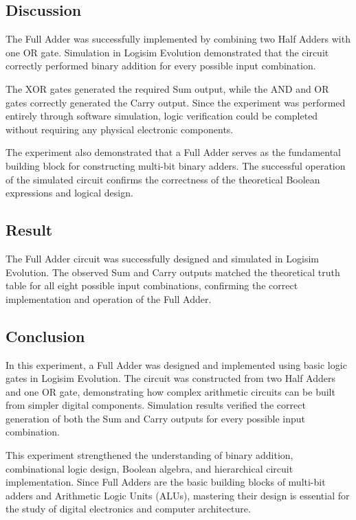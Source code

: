 \documentclass[12pt,a4paper]{article}
\begin{document}
\subsection{Discussion}

The Full Adder was successfully implemented by combining two Half Adders with one OR gate. Simulation in Logisim Evolution demonstrated that the circuit correctly performed binary addition for every possible input combination.

The XOR gates generated the required Sum output, while the AND and OR gates correctly generated the Carry output. Since the experiment was performed entirely through software simulation, logic verification could be completed without requiring any physical electronic components.

The experiment also demonstrated that a Full Adder serves as the fundamental building block for constructing multi-bit binary adders. The successful operation of the simulated circuit confirms the correctness of the theoretical Boolean expressions and logical design.

\subsection{Result}

The Full Adder circuit was successfully designed and simulated in Logisim Evolution. The observed Sum and Carry outputs matched the theoretical truth table for all eight possible input combinations, confirming the correct implementation and operation of the Full Adder.

\subsection{Conclusion}

In this experiment, a Full Adder was designed and implemented using basic logic gates in Logisim Evolution. The circuit was constructed from two Half Adders and one OR gate, demonstrating how complex arithmetic circuits can be built from simpler digital components. Simulation results verified the correct generation of both the Sum and Carry outputs for every possible input combination.

This experiment strengthened the understanding of binary addition, combinational logic design, Boolean algebra, and hierarchical circuit implementation. Since Full Adders are the basic building blocks of multi-bit adders and Arithmetic Logic Units (ALUs), mastering their design is essential for the study of digital electronics and computer architecture.
\end{document}
